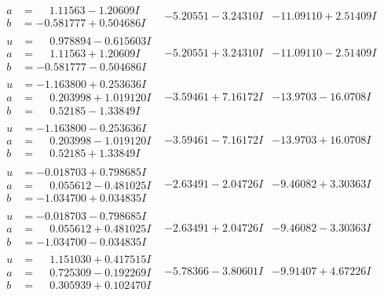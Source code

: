 \documentclass[1p]{elsarticle_modified}
\theoremstyle{definition}
\begin{document}
$$\begin{array}{c|c|c}
\begin{aligned}
a &= \phantom{-}1.11563 - 1.20609 I \\
b &= -0.581777 + 0.504686 I\end{aligned}
 & -5.20551 - 3.24310 I & -11.09110 + 2.51409 I \\ \hline\begin{aligned}
u &= \phantom{-}0.978894 - 0.615603 I \\
a &= \phantom{-}1.11563 + 1.20609 I \\
b &= -0.581777 - 0.504686 I\end{aligned}
 & -5.20551 + 3.24310 I & -11.09110 - 2.51409 I \\ \hline\begin{aligned}
u &= -1.163800 + 0.253636 I \\
a &= \phantom{-}0.203998 + 1.019120 I \\
b &= \phantom{-}0.52185 - 1.33849 I\end{aligned}
 & -3.59461 + 7.16172 I & -13.9703 - 16.0708 I \\ \hline\begin{aligned}
u &= -1.163800 - 0.253636 I \\
a &= \phantom{-}0.203998 - 1.019120 I \\
b &= \phantom{-}0.52185 + 1.33849 I\end{aligned}
 & -3.59461 - 7.16172 I & -13.9703 + 16.0708 I \\ \hline\begin{aligned}
u &= -0.018703 + 0.798685 I \\
a &= \phantom{-}0.055612 - 0.481025 I \\
b &= -1.034700 + 0.034835 I\end{aligned}
 & -2.63491 - 2.04726 I & -9.46082 + 3.30363 I \\ \hline\begin{aligned}
u &= -0.018703 - 0.798685 I \\
a &= \phantom{-}0.055612 + 0.481025 I \\
b &= -1.034700 - 0.034835 I\end{aligned}
 & -2.63491 + 2.04726 I & -9.46082 - 3.30363 I \\ \hline\begin{aligned}
u &= \phantom{-}1.151030 + 0.417515 I \\
a &= \phantom{-}0.725309 - 0.192269 I \\
b &= \phantom{-}0.305939 + 0.102470 I\end{aligned}
 & -5.78366 - 3.80601 I & -9.91407 + 4.67226 I \\ \hline\begin{aligned}

\end{aligned}
\end{array}$$
\end{document}
